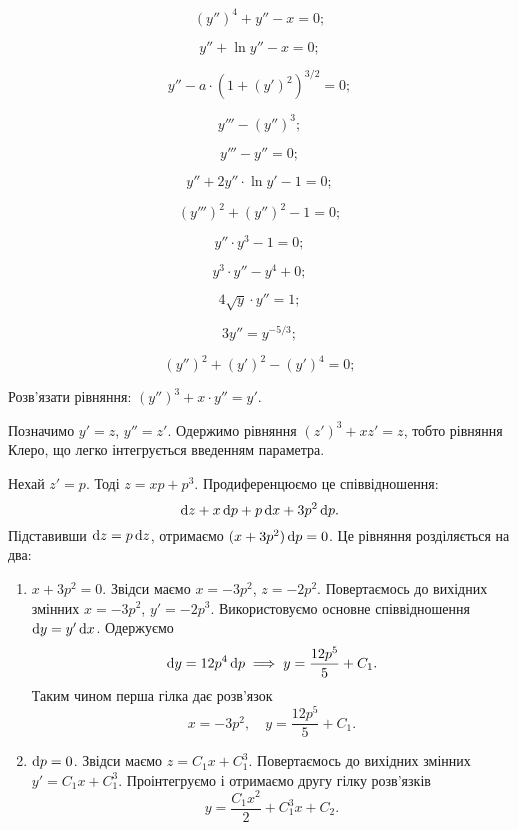\begin{multicols}{2}
\begin{problem}
	\[(y'')^4+y''-x=0;\]
\end{problem}
\begin{problem}
	\[y''+\ln y''-x=0;\]
\end{problem}
\begin{problem}
	\[y''-a\cdot(1+(y')^2)^{3/2}=0;\]
\end{problem}
\begin{problem}
	\[y'''-(y'')^3;\]
\end{problem}
\begin{problem}
	\[y'''-y''=0;\]
\end{problem}
\begin{problem}
	\[y''+2y''\cdot\ln y'-1=0;\]
\end{problem}
\begin{problem}
	\[(y''')^2+(y'')^2-1=0;\]
\end{problem}
\begin{problem}
	\[y''\cdot y^3-1=0;\]
\end{problem}
\begin{problem}
	\[y^3\cdot y''-y^4+0;\]
\end{problem}
\begin{problem}
	\[4\sqrt{y}\cdot y''=1;\]
\end{problem}
\begin{problem}
	\[3y''=y^{-5/3};\]
\end{problem}
\begin{problem}
	\[(y'')^2+(y')^2-(y')^4=0;\]
\end{problem}
\end{multicols}
\begin{example}
	Розв’язати рівняння: $(y'')^3 + x \cdot y'' = y'$.
\end{example}
\begin{solution}
	Позначимо $y'=z$, $y''=z'$. Одержимо рівняння $(z')^3+xz'=z$, тобто рівняння Клеро, що легко інтегрується введенням параметра. \parvskip

	Нехай $z' = p$. Тоді $z=xp+p^3$. Продиференцюємо це співвідношення: \[\mathop{}\!\mathrm{d} z + x \mathop{}\!\mathrm{d} p + p \mathop{}\!\mathrm{d} x + 3 p^2 \mathop{}\!\mathrm{d} p.\] Підставивши $\mathop{}\!\mathrm{d} z = p \mathop{}\!\mathrm{d} z$, отримаємо $(x+3p^2)\mathop{}\!\mathrm{d} p = 0$. Це рівняння розділяється на два:
	\begin{enumerate}
		\item $x + 3p^2 = 0$. Звідси маємо $x = -3p^2$, $z=-2p^2$. Повертаємось до вихідних змінних $x=-3p^2$, $y'=-2p^3$. Використовуємо основне співвідношення $\mathop{}\!\mathrm{d} y = y' \mathop{}\!\mathrm{d} x$. Одержуємо \[ \mathop{}\!\mathrm{d} y = 12 p^4 \mathop{}\!\mathrm{d} p \implies y = \frac{12p^5}{5} + C_1.\] Таким чином перша гілка дає розв’язок \[ x = -3p^2, \quad y=\frac{12p^5}{5} + C_1.\]
		\item $\mathop{}\!\mathrm{d} p = 0$. Звідси маємо $z = C_1 x + C_1^3$. Повертаємось до вихідних змінних $y'=C_1x+C_1^3$. Проінтегруємо і отримаємо другу гілку розв’язків \[y=\frac{C_1x^2}{2}+C_1^3x+C_2.\]
	\end{enumerate}
\end{solution}
